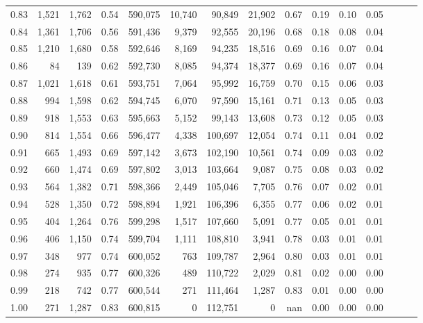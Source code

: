 \begin{tabular}{rrrrrrrrrrrrrrr}
0.83 &   1,521 &  1,762 &  0.54 &  590,075 &   10,740 &   90,849 &   21,902 &  0.67 &  0.19 &  0.10 &      0.05 \\
0.84 &   1,361 &  1,706 &  0.56 &  591,436 &    9,379 &   92,555 &   20,196 &  0.68 &  0.18 &  0.08 &      0.04 \\
0.85 &   1,210 &  1,680 &  0.58 &  592,646 &    8,169 &   94,235 &   18,516 &  0.69 &  0.16 &  0.07 &      0.04 \\
0.86 &      84 &    139 &  0.62 &  592,730 &    8,085 &   94,374 &   18,377 &  0.69 &  0.16 &  0.07 &      0.04 \\
0.87 &   1,021 &  1,618 &  0.61 &  593,751 &    7,064 &   95,992 &   16,759 &  0.70 &  0.15 &  0.06 &      0.03 \\
0.88 &     994 &  1,598 &  0.62 &  594,745 &    6,070 &   97,590 &   15,161 &  0.71 &  0.13 &  0.05 &      0.03 \\
0.89 &     918 &  1,553 &  0.63 &  595,663 &    5,152 &   99,143 &   13,608 &  0.73 &  0.12 &  0.05 &      0.03 \\
0.90 &     814 &  1,554 &  0.66 &  596,477 &    4,338 &  100,697 &   12,054 &  0.74 &  0.11 &  0.04 &      0.02 \\
0.91 &     665 &  1,493 &  0.69 &  597,142 &    3,673 &  102,190 &   10,561 &  0.74 &  0.09 &  0.03 &      0.02 \\
0.92 &     660 &  1,474 &  0.69 &  597,802 &    3,013 &  103,664 &    9,087 &  0.75 &  0.08 &  0.03 &      0.02 \\
0.93 &     564 &  1,382 &  0.71 &  598,366 &    2,449 &  105,046 &    7,705 &  0.76 &  0.07 &  0.02 &      0.01 \\
0.94 &     528 &  1,350 &  0.72 &  598,894 &    1,921 &  106,396 &    6,355 &  0.77 &  0.06 &  0.02 &      0.01 \\
0.95 &     404 &  1,264 &  0.76 &  599,298 &    1,517 &  107,660 &    5,091 &  0.77 &  0.05 &  0.01 &      0.01 \\
0.96 &     406 &  1,150 &  0.74 &  599,704 &    1,111 &  108,810 &    3,941 &  0.78 &  0.03 &  0.01 &      0.01 \\
0.97 &     348 &    977 &  0.74 &  600,052 &      763 &  109,787 &    2,964 &  0.80 &  0.03 &  0.01 &      0.01 \\
0.98 &     274 &    935 &  0.77 &  600,326 &      489 &  110,722 &    2,029 &  0.81 &  0.02 &  0.00 &      0.00 \\
0.99 &     218 &    742 &  0.77 &  600,544 &      271 &  111,464 &    1,287 &  0.83 &  0.01 &  0.00 &      0.00 \\
1.00 &     271 &  1,287 &  0.83 &  600,815 &        0 &  112,751 &        0 &   nan &  0.00 &  0.00 &      0.00 \\
\bottomrule
\end{tabular}
